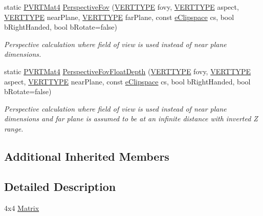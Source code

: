 \begin{DoxyCompactItemize}
static \hyperlink{struct_p_v_r_t_mat4}{P\+V\+R\+T\+Mat4} \hyperlink{struct_p_v_r_t_mat4_a9e6ccece8c34673154a72f993d10529b}{Perspective\+Fov} (\hyperlink{group___a_p_i___o_g_l_e_s_ga06da457b7d3e93368ab904f89e1396be}{V\+E\+R\+T\+T\+Y\+P\+E} fovy, \hyperlink{group___a_p_i___o_g_l_e_s_ga06da457b7d3e93368ab904f89e1396be}{V\+E\+R\+T\+T\+Y\+P\+E} aspect, \hyperlink{group___a_p_i___o_g_l_e_s_ga06da457b7d3e93368ab904f89e1396be}{V\+E\+R\+T\+T\+Y\+P\+E} near\+Plane, \hyperlink{group___a_p_i___o_g_l_e_s_ga06da457b7d3e93368ab904f89e1396be}{V\+E\+R\+T\+T\+Y\+P\+E} far\+Plane, const \hyperlink{struct_p_v_r_t_mat4_aad804cddb0d3f6799550aaa703d71e96}{e\+Clipspace} cs, bool b\+Right\+Handed, bool b\+Rotate=false)
\begin{DoxyCompactList}\small\item\em Perspective calculation where field of view is used instead of near plane dimensions. \end{DoxyCompactList}\item 
static \hyperlink{struct_p_v_r_t_mat4}{P\+V\+R\+T\+Mat4} \hyperlink{struct_p_v_r_t_mat4_af177ade8666861154ae90a056d7ca3e8}{Perspective\+Fov\+Float\+Depth} (\hyperlink{group___a_p_i___o_g_l_e_s_ga06da457b7d3e93368ab904f89e1396be}{V\+E\+R\+T\+T\+Y\+P\+E} fovy, \hyperlink{group___a_p_i___o_g_l_e_s_ga06da457b7d3e93368ab904f89e1396be}{V\+E\+R\+T\+T\+Y\+P\+E} aspect, \hyperlink{group___a_p_i___o_g_l_e_s_ga06da457b7d3e93368ab904f89e1396be}{V\+E\+R\+T\+T\+Y\+P\+E} near\+Plane, const \hyperlink{struct_p_v_r_t_mat4_aad804cddb0d3f6799550aaa703d71e96}{e\+Clipspace} cs, bool b\+Right\+Handed, bool b\+Rotate=false)
\begin{DoxyCompactList}\small\item\em Perspective calculation where field of view is used instead of near plane dimensions and far plane is assumed to be at an infinite distance with inverted Z range. \end{DoxyCompactList}\end{DoxyCompactItemize}
\subsection*{Additional Inherited Members}


\subsection{Detailed Description}
4x4 \hyperlink{class_matrix}{Matrix} 



 

